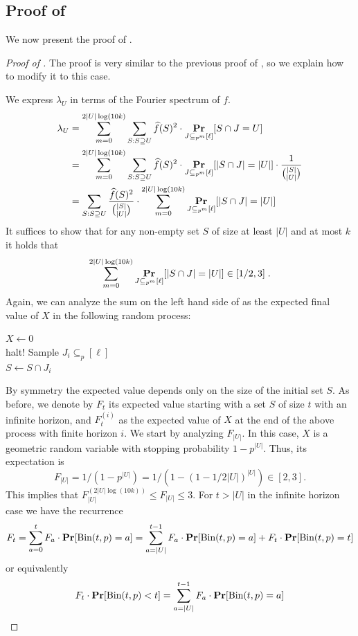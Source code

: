 \documentclass[10pt,a4paper]{article}
\theoremstyle{plain}
\theoremstyle{remark}
\theoremstyle{plain}
\renewcommand{\Pr}{\mathop{\bf Pr\/}}
\renewcommand{\hat}{\widehat}
\newcommand{\Binomial}{\textrm{Bin}}
\begin{document}
\subsection{Proof of }
\label{subsection:proof-ninf-ub-lb-set}
We now present the proof of .
\begin{proof}[Proof of ]
The proof is very similar to the previous proof of , so we explain how to modify it to this case.	

We express $\lambda_U$ in terms of the Fourier spectrum of $f$.
\begin{align*}
\lambda_U &= \sum_{m=0}^{2|U|\log(10k)} \sum_{S: S \supseteq U} \hat{f}(S)^2 \cdot \Pr_{J \subseteq_{p^{m}} [\ell]}[ S \cap J = U]
\\ &= \sum_{m=0}^{2|U|\log(10k)} \sum_{S: S \supseteq U} \hat{f}(S)^2 \cdot \Pr_{J \subseteq_{p^{m}} [\ell]}[ |S \cap J| = |U|] \cdot \frac{1}{\binom{|S|}{|U|}}
\\&=\sum_{S: S \supseteq U} \frac{\hat{f}(S)^2}{\binom{|S|}{|U|}} \cdot \sum_{m=0}^{2|U|\log(10k)} \Pr_{J \subseteq_{p^{m}} [\ell]}[ |S \cap J| = |U|]\end{align*}
It suffices to show that for any non-empty set $S$ of size at least $|U|$ and at most $k$ it holds that
\begin{equation}\label{eq:2}
\sum_{m=0}^{2|U|\log(10k)} \Pr_{J \subseteq_{p^{m}} [\ell]}[ |S \cap J| = |U|] \in [1/2,3]\;.
\end{equation}
Again, we can analyze the sum on the left hand side of  as the expected final value of $X$ in the following random process:

\begin{algorithm}
$X \leftarrow 0$ \\
 {
     { 
        halt!
    }
	Sample $J_i \subseteq_p [\ell]$ \\
	$S \leftarrow S \cap J_i$
}
\end{algorithm}
By symmetry the expected value depends only on the size of the initial set $S$.
As before, we denote by $F_{t}$ its expected value starting with a set $S$ of size $t$ with an infinite horizon, and $F_t^{(i)}$ as the expected value of $X$ at the end of the above process with finite horizon $i$.
We start by analyzing $F_{|U|}$.
In this case, $X$ is a geometric random variable with stopping probability $1- p^{|U|}$.
Thus, its expectation is $$F_{|U|} = 1/(1-p^{|U|}) = 1/(1-(1-1/2|U|)^{|U|}) \in [2,3].$$
This implies that $F_{|U|}^{(2|U|\log(10k))} \leq F_{|U|} \leq 3$. For $t > |U|$ in the infinite horizon case we have the recurrence
\begin{equation}
	F_t = \sum_{a=0}^{t} F_a \cdot \Pr[\Binomial(t,p)=a]
	 = \sum_{a=|U|}^{t-1} F_a \cdot \Pr[\Binomial(t,p)=a]  + F_t \cdot \Pr[\Binomial(t,p)=t]
\end{equation}
or equivalently
\begin{equation}
	F_t\cdot \Pr[\Binomial(t,p)<t] = \sum_{a=|U|}^{t-1} F_a \cdot \Pr[\Binomial(t,p)=a]
\end{equation}


\end{proof}
\end{document}
